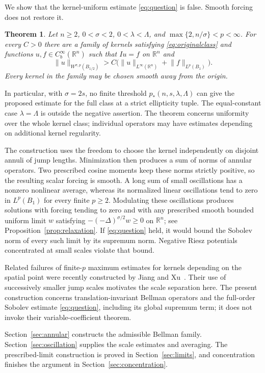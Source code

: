 \documentclass[11pt]{article}
\newcommand{\R}{\mathbb R}
\newcommand{\norm}[1]{\lVert#1\rVert}
\newtheorem{theorem}{Theorem}[section]
\theoremstyle{remark}
\numberwithin{equation}{section}
\begin{document}
We show that the kernel-uniform estimate \eqref{eq:question} is false.
Smooth forcing does not restore it.
\begin{theorem}\label{thm:main}
Let $n\ge2$, $0<\sigma<2$, $0<\lambda<\Lambda$, and
$\max\{2,n/\sigma\}<p<\infty$. For every $C>0$ there are a family
of kernels satisfying \eqref{eq:originalclass} and functions
$u,f\in C_b^\infty(\R^n)$ such that $Iu=f$ on $\R^n$ and
\[
 \norm u_{W^{\sigma,p}(B_{1/2})}
 > C\bigl(\norm u_{L^\infty(\R^n)}+\norm f_{L^p(B_1)}\bigr).
\]
Every kernel in the family may be chosen smooth away from the origin.
\end{theorem}
In particular, with $\sigma=2s$, no finite threshold
$p_*(n,s,\lambda,\Lambda)$ can give the proposed estimate for the full
class at a strict ellipticity tuple. The equal-constant case
$\lambda=\Lambda$ is outside the negative assertion. The theorem
concerns uniformity over the whole kernel class; individual operators
may have estimates depending on additional kernel regularity.

The construction uses the freedom to choose the kernel independently
on disjoint annuli of jump lengths. Minimization then produces a sum
of norms of annular operators. Two prescribed cosine moments keep
these norms strictly positive, so the resulting scalar forcing is
smooth. A long sum of small oscillations has a nonzero nonlinear
average, whereas its normalized linear oscillations tend to zero in
$L^p(B_1)$ for every finite $p\ge2$. Modulating these oscillations
produces solutions with forcing tending to zero and with any prescribed
smooth bounded uniform limit $w$ satisfying
$-(-\Delta)^{\sigma/2}w\ge0$ on $\R^n$; see
Proposition~\ref{prop:relaxation}. If \eqref{eq:question} held, it would bound the Sobolev
norm of every such limit by its supremum norm. Negative Riesz
potentials concentrated at small scales violate that bound.

Related failures of finite-$p$ maximum estimates for kernels depending
on the spatial point were recently constructed by Jiang and
Xu~\cite{JiangXu}. Their use of successively smaller jump scales
motivates the scale separation here. The present construction concerns
translation-invariant Bellman operators and the full-order Sobolev
estimate \eqref{eq:question}, including its global supremum term; it
does not invoke their variable-coefficient theorem.

Section~\ref{sec:annular} constructs the admissible Bellman family.
Section~\ref{sec:oscillation} supplies the scale estimates and averaging.
The prescribed-limit construction is proved in
Section~\ref{sec:limits}, and concentration finishes the argument in
Section~\ref{sec:concentration}.
\end{document}
